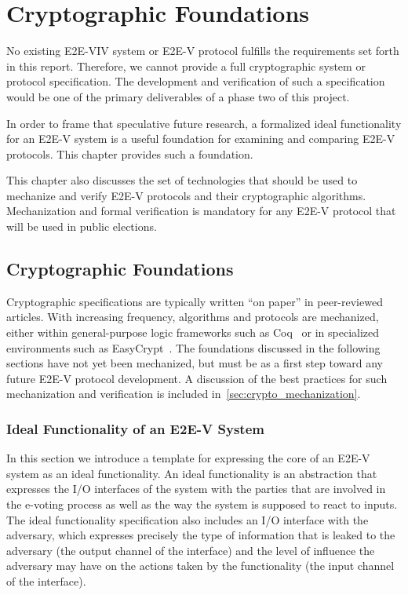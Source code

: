 \chapter{Cryptographic Foundations}
\label{chapter:crypto_spec}

\iftechreport

No existing E2E-VIV system or E2E-V protocol fulfills the requirements
set forth in this report. Therefore, we cannot provide a full
cryptographic system or protocol specification.  The development and
verification of such a specification would be one of the primary
deliverables of a phase two of this project.

In order to frame that speculative future research, a formalized ideal
functionality for an E2E-V system is a useful foundation for examining
and comparing E2E-V protocols. This chapter provides such a foundation.

This chapter also discusses the set of technologies that should be
used to mechanize and verify E2E-V protocols and their cryptographic
algorithms. Mechanization and formal verification is mandatory for any
E2E-V protocol that will be used in public elections.

\section{Cryptographic Foundations}

Cryptographic specifications are typically written ``on paper'' in
peer-reviewed articles. With increasing frequency, algorithms and
protocols are mechanized, either within general-purpose logic
frameworks such as Coq~\cite{Coq} or in specialized environments such
as EasyCrypt~\cite{EasyCrypt}. The foundations discussed in the
following sections have not yet been mechanized, but must be as a
first step toward any future E2E-V protocol development. A discussion of
the best practices for such mechanization and verification is included
in~\autoref{sec:crypto_mechanization}.

\subsection{Ideal Functionality of an E2E-V System}

In this section we introduce a template for expressing the core of an
E2E-V system as an ideal functionality. An ideal
functionality is an abstraction that expresses the I/O interfaces of
the system with the parties that are involved in the e-voting process
as well as the way the system is supposed to react to inputs. The
ideal functionality specification also includes an I/O interface with
the adversary, which expresses precisely the type of information that
is leaked to the adversary (the output channel of the interface) and
the level of influence the adversary may have on the actions taken by
the functionality (the input channel of the interface).

